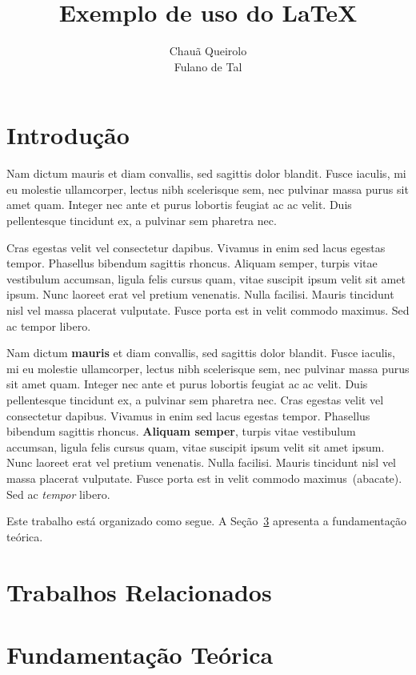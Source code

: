 \documentclass[12pt]{article}
\title{Exemplo de uso do \LaTeX}
\author{Chauã Queirolo\\Fulano de Tal}
\date{}
\begin{document}
 
\maketitle
\tableofcontents

\section{Introdução}
\label{sec_introducao}

Nam dictum mauris et diam convallis, sed sagittis dolor blandit. Fusce iaculis, mi eu molestie ullamcorper, lectus nibh scelerisque sem, nec pulvinar massa purus sit amet quam. Integer nec ante et purus lobortis feugiat ac ac velit. Duis pellentesque tincidunt ex, a pulvinar sem pharetra nec. 

Cras egestas velit vel consectetur dapibus. Vivamus in enim sed lacus egestas tempor. Phasellus bibendum sagittis rhoncus. Aliquam semper, turpis vitae vestibulum accumsan, ligula felis cursus quam, vitae suscipit ipsum velit sit amet ipsum. Nunc laoreet erat vel pretium venenatis. Nulla facilisi. Mauris tincidunt nisl vel massa placerat vulputate. Fusce porta est in velit commodo maximus. Sed ac tempor libero.

Nam dictum \textbf{mauris} et diam convallis, sed sagittis dolor blandit. Fusce iaculis, mi eu molestie ullamcorper, lectus nibh scelerisque sem, nec pulvinar massa purus sit amet quam. Integer nec ante et purus lobortis feugiat ac ac velit. Duis pellentesque tincidunt ex, a pulvinar sem pharetra nec. Cras egestas velit vel consectetur dapibus. Vivamus in enim sed lacus egestas tempor. Phasellus bibendum sagittis rhoncus. \textbf{Aliquam semper}, turpis vitae vestibulum accumsan, ligula felis cursus quam, vitae suscipit ipsum velit sit amet ipsum. Nunc laoreet erat vel pretium venenatis. Nulla facilisi. Mauris tincidunt nisl vel massa placerat vulputate. Fusce porta est in velit commodo maximus~(abacate). Sed ac \textit{tempor} libero.

Este trabalho está organizado como segue. A Seção~\ref{sec_fundamentacao} apresenta a fundamentação teórica.

\section{Trabalhos Relacionados}
\label{sec_trabalhos}


\section{Fundamentação Teórica}
\label{sec_fundamentacao}
\end{document}
